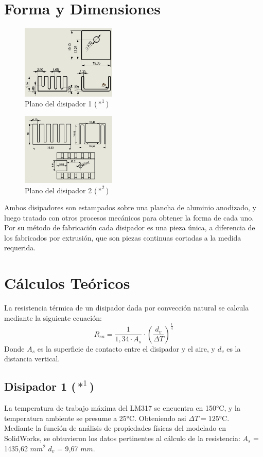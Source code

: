 \documentclass[conference]{IEEEtran}
\begin{document}
\section{Forma y Dimensiones}
\begin{figure}[H]
    \centering
    \includegraphics[width=0.4\textwidth]{DisipadorFacuCuadrado.png}
    \caption{Plano del disipador 1 ($*^1$)}
\end{figure}
\begin{figure}[H]
    \centering
    \includegraphics[width=0.4\textwidth]{PlanoRamiCompleto.png}
    \caption{Plano del disipador 2 ($*^2$)}
\end{figure}
Ambos disipadores son estampados sobre una plancha de aluminio anodizado, y luego tratado con otros 
procesos mecánicos para obtener la forma de cada uno. Por su método de fabricación cada disipador
es una pieza única, a diferencia de los fabricados por extrusión, que son piezas continuas cortadas 
a la medida requerida.

\section{Cálculos Teóricos}
La resistencia térmica de un disipador dada por convección natural se calcula mediante la siguiente
ecuación:
\begin{equation}
    R_{sa} = \frac{1}{1,34\cdot A_s}\cdot (\frac{d_v}{\Delta T})^{\frac{1}{4}}
\end{equation}
Donde $A_s$ es la superficie de contacto entre el disipador y el aire, y $d_v$ es la distancia vertical.

\subsection{Disipador 1 ($*^1$)}
La temperatura de trabajo máxima del LM317 se encuentra en 150°C, y la temperatura ambiente
se presume a 25°C. Obteniendo asi $\Delta T = 125$°C.\\
Mediante la función de análisis de propiedades físicas del modelado en SolidWorks, se obtuvieron
los datos pertinentes al cálculo de la resistencia:
$A_s$ = 1435,62 $mm^2$
$d_v$ = 9,67 $mm$.
\end{document}
